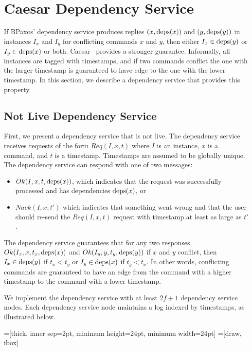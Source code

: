 \section{Caesar Dependency Service}
If BPaxos' dependency service produces replies $(x, \text{deps}(x))$ and $(y,
\text{deps}(y))$ in instances $I_x$ and $I_y$ for conflicting commands $x$ and $y$,
then either $I_x \in \text{deps}(y)$ or $I_y \in \text{deps}(x)$ or both.
Caesar~\cite{arun2017speeding} provides a stronger guarantee. Informally, all
instances are tagged with timestamps, and if two commands conflict the one with
the larger timestamp is guaranteed to have edge to the one with the lower
timestamp. In this section, we describe a dependency service that provides this
property.

\subsection{Not Live Dependency Service}
First, we present a dependency service that is not live. The dependency service
receives requests of the form $Req(I, x, t)$ where $I$ is an instance, $x$ is a
command, and $t$ is a timestamp. Timestamps are assumed to be globally unique.
The dependency service can respond with one of two messages:
\begin{itemize}
  \item
    $Ok(I, x, t, \text{deps}(x))$, which indicates that the request was successfully
    processed and has dependencies $\text{deps}(x)$, or
  \item
    $Nack(I, x, t')$ which indicates that something went wrong and that the
    user should re-send the $Req(I, x, t)$ request with timestamp at least as
    large as $t'$.
\end{itemize}

The dependency service guarantees that for any two responses $Ok(I_x, x, t_x,
\text{deps}(x))$ and $Ok(I_y, y, t_y, \text{deps}(y))$ if $x$ and $y$ conflict, then $I_x
\in \text{deps}(y)$ if $t_x < t_y$ or $I_y \in \text{deps}(x)$ if $t_y < t_x$. In other
words, conflicting commands are guaranteed to have an edge from the command
with a higher timestamp to the command with a lower timestamp.

We implement the dependency service with at least $2f + 1$ dependency service
nodes. Each dependency service node maintains a log indexed by timestamps, as
illustrated below.

=[thick, inner sep=2pt, minimum height=24pt, minimum width=24pt]
=[draw, ibox]
\begin{center}
\end{center}

